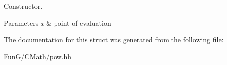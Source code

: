 Constructor. 


\begin{DoxyParams}{Parameters}
{\em x} & point of evaluation \\
\hline
\end{DoxyParams}


The documentation for this struct was generated from the following file\-:\begin{DoxyCompactItemize}
\item 
Fun\-G/\-C\-Math/pow.\-hh\end{DoxyCompactItemize}
